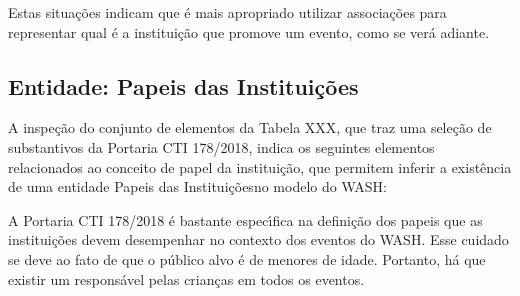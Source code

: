 \documentclass[
12pt,		%
openright,	%
twoside,  %
a4paper,			%
chapter=TITLE,		%
english,			%
french,				%
spanish,			%
brazil				%
]{USPSC-classe/USPSC}
\begin{document}
Estas situa\c{c}\~oes indicam que \'e mais apropriado utilizar associa\c{c}\~oes para representar qual \'e a institui\c{c}\~ao que promove um evento, como se ver\'a adiante.














\subsection[Entidade: Papeis das Institui\c{c}\~oes]{Entidade: Papeis das Institui\c{c}\~oes}\label{Entidade: Papeis das Institui\c{c}\~oes}
A inspe\c{c}\~ao do conjunto de elementos da Tabela XXX, que traz uma sele\c{c}\~ao de substantivos da Portaria CTI 178/2018, indica os seguintes elementos relacionados ao conceito de \textquotedbl papel da institui\c{c}\~ao\textquotedbl , que permitem inferir a exist\^encia de uma entidade \textquotedbl Papeis das Institui\c{c}\~oes\textquotedbl  no modelo do WASH:















\noindent\begin{center}\mbox{\centering{}}\end{center}


A Portaria CTI 178/2018 \'e bastante espec\'{\i}fica na defini\c{c}\~ao dos papeis que as institui\c{c}\~oes devem desempenhar no contexto dos eventos do WASH. Esse cuidado se deve ao fato de que o p\'ublico alvo \'e de menores de idade. Portanto, h\'a que existir um respons\'avel pelas crian\c{c}as em todos os eventos.
\end{document}
